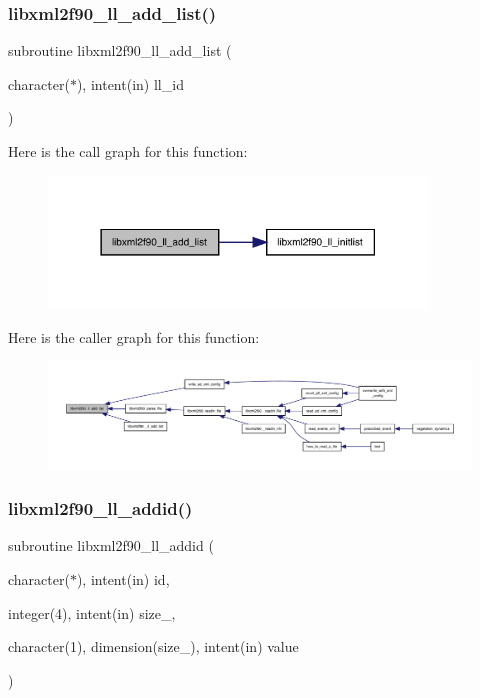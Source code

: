 \subsubsection{\texorpdfstring{libxml2f90\+\_\+ll\+\_\+add\+\_\+list()}{libxml2f90\_ll\_add\_list()}}
{\footnotesize\ttfamily subroutine libxml2f90\+\_\+ll\+\_\+add\+\_\+list (\begin{DoxyParamCaption}\item[{character($\ast$), intent(in)}]{ll\+\_\+id }\end{DoxyParamCaption})}

Here is the call graph for this function\+:
\nopagebreak
\begin{figure}[H]
\begin{center}
\leavevmode
\includegraphics[width=285pt]{libxml2f90_8f90__pp_8f90_a1eaede8d08ffde30b3ef74f657ac0126_cgraph}
\end{center}
\end{figure}
Here is the caller graph for this function\+:
\nopagebreak
\begin{figure}[H]
\begin{center}
\leavevmode
\includegraphics[width=350pt]{libxml2f90_8f90__pp_8f90_a1eaede8d08ffde30b3ef74f657ac0126_icgraph}
\end{center}
\end{figure}
\mbox{\label{libxml2f90_8f90__pp_8f90_aedf302b29e22ba3b7312a7650ac0134b}} 
\subsubsection{\texorpdfstring{libxml2f90\+\_\+ll\+\_\+addid()}{libxml2f90\_ll\_addid()}}
{\footnotesize\ttfamily subroutine libxml2f90\+\_\+ll\+\_\+addid (\begin{DoxyParamCaption}\item[{character($\ast$), intent(in)}]{id,  }\item[{integer(4), intent(in)}]{size\+\_\+,  }\item[{character(1), dimension(size\+\_\+), intent(in)}]{value }\end{DoxyParamCaption})}

